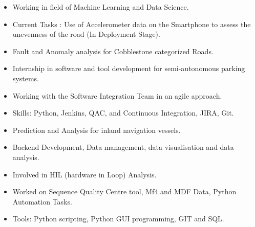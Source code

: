 \documentclass[10pt,a4paper,ragged2e]{altacv}
\begin{document}
\begin{itemize}
\item Working in field of Machine Learning and Data Science.
\item Current Tasks : Use of Accelerometer data on the Smartphone to assess the unevenness of the road (In Deployment Stage).
\item Fault and Anomaly analysis for Cobblestone categorized Roads.

\divider

\end{itemize}




\begin{itemize}
\item Internship in software and tool development for semi-autonomous parking systems.
\item Working with the Software Integration Team in an agile approach.
\item Skills: Python, Jenkins, QAC, and Continuous Integration, JIRA, Git.



\end{itemize}

\divider

\begin{itemize}
\item Prediction and Analysis for inland navigation vessels.
\end{itemize}



\divider


\begin{itemize}
\item Backend Development, Data management, data visualisation and data analysis.
\item Involved in HIL (hardware in Loop) Analysis.
\item Worked on Sequence Quality Centre tool, Mf4 and MDF Data, Python Automation Tasks.
\item Tools: Python scripting, Python GUI programming, GIT and SQL.



\end{itemize}
\end{document}
